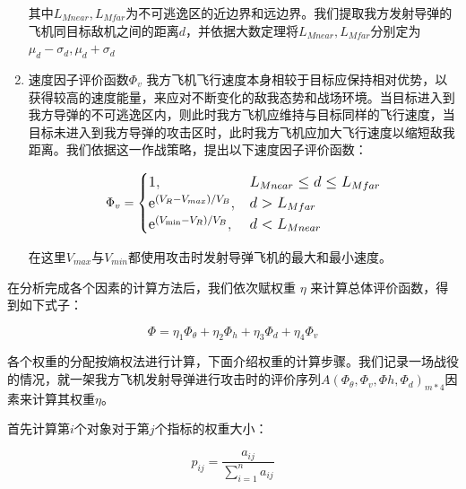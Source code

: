 \documentclass{my_paper}
\begin{document}
\begin{enumerate}
    其中$L_{Mnear},L_{Mfar}$为不可逃逸区的近边界和远边界。我们提取我方发射导弹的飞机同目标敌机之间的距离$d$，并依据大数定理将$L_{Mnear},L_{Mfar}$分别定为$\mu_d - \sigma_d,\mu_d + \sigma_d$

    \item 速度因子评价函数$\Phi _{v}$
    我方飞机飞行速度本身相较于目标应保持相对优势，以获得较高的速度能量，来应对不断变化的敌我态势和战场环境。当目标进入到我方导弹的不可逃逸区内，则此时我方飞机应维持与目标同样的飞行速度，当目标未进入到我方导弹的攻击区时，此时我方飞机应加大飞行速度以缩短敌我距离。我们依据这一作战策略，提出以下速度因子评价函数：

    \begin{equation}
        \large\Phi_v = \begin{cases}1,&L_{Mnear}\leq d \leq L_{Mfar}\\\mathrm{e}^{\left(V_{R }-V_{max}\right) / V_{B}},&d>L_{Mfar}\\\mathrm{e}^{\left(V_{\min }-V_{R}\right) / V_{B}},&d<L_{Mnear}\end{cases}
    \end{equation}

    在这里$V_{max}$与$V_{min}$都使用攻击时发射导弹飞机的最大和最小速度。
\end{enumerate}

在分析完成各个因素的计算方法后，我们依次赋权重 $ \eta $ 来计算总体评价函数，得到如下式子：

\begin{equation}
\Phi = \eta_{1}\Phi_{\theta}+\eta_{2}\Phi_{h}+\eta_{3}\Phi_{d}+\eta_{4}\Phi_{v}
\end{equation}

各个权重的分配按熵权法进行计算，下面介绍权重的计算步骤。我们记录一场战役的情况，就一架我方飞机发射导弹进行攻击时的评价序列$A(\Phi_{\theta},\Phi_{v},\Phi{h},\Phi_{d})_{m*4}$因素来计算其权重$ \eta $。

首先计算第$ i $个对象对于第$ j $个指标的权重大小：

\begin{equation}
p_{ij} = \frac{a_{ij}}{\sum_{i=1}^{n}a_{ij}}
\end{equation}
\end{document}
